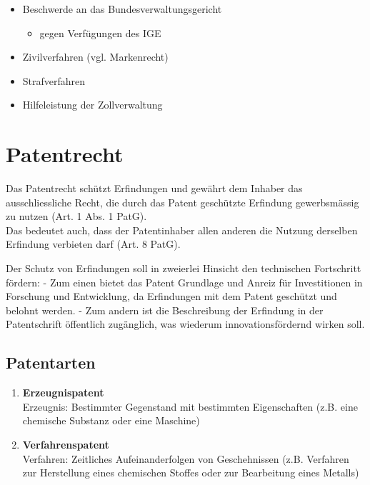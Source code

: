 \begin{itemize}
\tightlist
\item
  Beschwerde an das Bundesverwaltungsgericht

  \begin{itemize}
  \tightlist
  \item
    gegen Verfügungen des IGE
  \end{itemize}
\item
  Zivilverfahren (vgl. Markenrecht)
\item
  Strafverfahren
\item
  Hilfeleistung der Zollverwaltung
\end{itemize}

\hypertarget{patentrecht}{%
\section{Patentrecht}\label{patentrecht}}

Das Patentrecht schützt Erfindungen und gewährt dem Inhaber das
ausschliessliche Recht, die durch das Patent geschützte Erfindung
gewerbsmässig zu nutzen (Art. 1 Abs. 1 PatG).\\
Das bedeutet auch, dass der Patentinhaber allen anderen die Nutzung
derselben Erfindung verbieten darf (Art. 8 PatG).

Der Schutz von Erfindungen soll in zweierlei Hinsicht den technischen
Fortschritt fördern: - Zum einen bietet das Patent Grundlage und Anreiz
für Investitionen in Forschung und Entwicklung, da Erfindungen mit dem
Patent geschützt und belohnt werden. - Zum andern ist die Beschreibung
der Erfindung in der Patentschrift öffentlich zugänglich, was wiederum
innovationsfördernd wirken soll.

\hypertarget{patentarten}{%
\subsection{Patentarten}\label{patentarten}}

\begin{enumerate}
\def\labelenumi{\arabic{enumi}.}
\tightlist
\item
  \textbf{Erzeugnispatent}\\
  Erzeugnis: Bestimmter Gegenstand mit bestimmten Eigenschaften (z.B.
  eine chemische Substanz oder eine Maschine)
\item
  \textbf{Verfahrenspatent}\\
  Verfahren: Zeitliches Aufeinanderfolgen von Geschehnissen (z.B.
  Verfahren zur Herstellung eines chemischen Stoffes oder zur
  Bearbeitung eines Metalls)
\end{enumerate}


